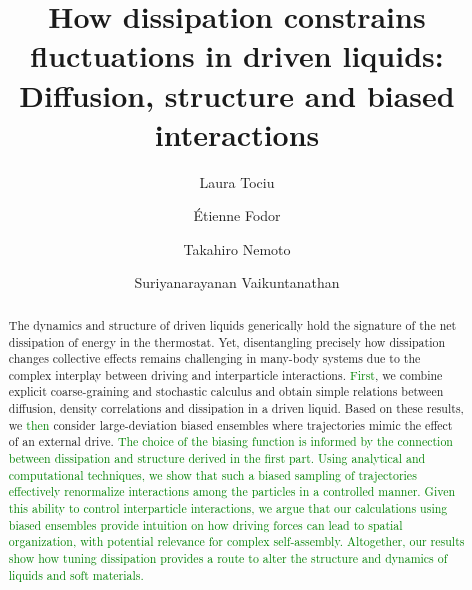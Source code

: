 \documentclass[superscriptaddress, twocolumn, prx, longbibliography, nofootinbib]{revtex4-1}
\begin{document}
\title{How dissipation constrains fluctuations in driven liquids:\\Diffusion, structure and biased interactions}
\author{Laura Tociu}

\author{\'Etienne Fodor}

\author{Takahiro Nemoto}

\author{Suriyanarayanan Vaikuntanathan}

\begin{abstract}

The dynamics and structure of driven liquids generically hold the signature of the net dissipation of energy in the thermostat. Yet, disentangling precisely how dissipation changes collective effects remains challenging in many-body systems due to the complex interplay between driving and interparticle interactions. \textcolor{green}{First}, we combine explicit coarse-graining and stochastic calculus and obtain simple relations between diffusion, density correlations and dissipation in a driven liquid. Based on these results, we \textcolor{green}{then} consider large-deviation biased ensembles where trajectories mimic the effect of an external drive. \textcolor{green}{The choice of the biasing function is informed by the connection between dissipation and structure derived in the first part. Using analytical and computational techniques, we show that such a biased sampling of trajectories effectively renormalize interactions among the particles in a controlled manner. Given this ability to control interparticle interactions, we argue that our calculations using biased ensembles provide intuition on how driving forces can lead to spatial organization, with potential relevance for complex self-assembly. Altogether, our results show how tuning dissipation provides a route to alter the structure and dynamics of liquids and soft materials.}

\end{abstract}
\end{document}

